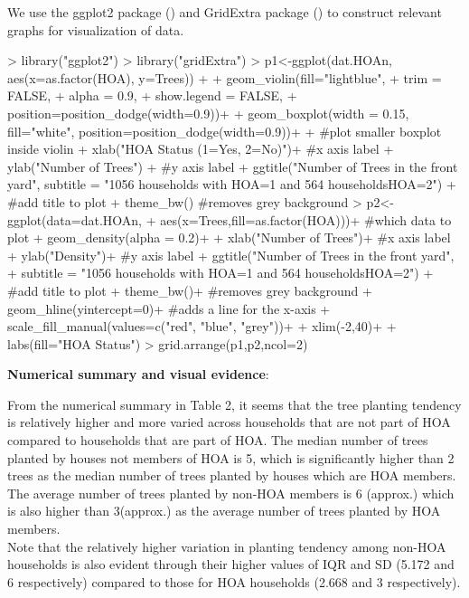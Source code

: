 \documentclass{article}
\begin{document}
We use the ggplot2 package ({\cite{ggplot2q}}) and GridExtra package ({\cite{gride}}) to construct relevant graphs for visualization of data.

\begin{Schunk}
\begin{Sinput}
> library("ggplot2") 
> library("gridExtra")
> p1<-ggplot(dat.HOAn, aes(x=as.factor(HOA), y=Trees)) + 
+   geom_violin(fill="lightblue",    
+               trim = FALSE,
+               alpha = 0.9, 
+               show.legend = FALSE,
+               position=position_dodge(width=0.9))+
+   geom_boxplot(width = 0.15, fill="white", position=position_dodge(width=0.9))+
+   #plot smaller boxplot inside violin
+   xlab("HOA Status (1=Yes, 2=No)")+ #x axis label
+   ylab("Number of Trees")    + #y axis label
+   ggtitle("Number of Trees in the front yard", subtitle = "1056 households with HOA=1 and 564 households\nwith HOA=2") + #add title to plot
+   theme_bw()  #removes grey background 
> p2<-ggplot(data=dat.HOAn, 
+            aes(x=Trees,fill=as.factor(HOA)))+ #which data to plot
+   geom_density(alpha = 0.2)+
+   xlab("Number of Trees")+ #x axis label
+   ylab("Density")+ #y axis label
+   ggtitle("Number of Trees in the front yard",
+           subtitle = "1056 households with HOA=1 and 564 households\nwith HOA=2") + #add title to plot
+   theme_bw()+ #removes grey background 
+   geom_hline(yintercept=0)+  #adds a line for the x-axis
+   scale_fill_manual(values=c("red", "blue", "grey"))+
+   xlim(-2,40)+
+   labs(fill="HOA Status")
> grid.arrange(p1,p2,ncol=2)
\end{Sinput}
\end{Schunk}

\textbf{Numerical summary and visual evidence}: 

From the numerical summary in Table 2, it seems that the tree planting tendency is relatively higher and more varied across households that are not part of HOA compared to households that are part of HOA. The median number of trees planted by houses not members of HOA is 5, which is significantly higher than 2 trees as the median number of trees planted by houses which are HOA members. The average number of trees planted by non-HOA members is 6 (approx.) which is also higher than 3(approx.) as the average number of trees planted by HOA members.\\

Note that the relatively higher variation in planting tendency among non-HOA households is also evident through their higher values of IQR and SD (5.172 and 6 respectively) compared to those for HOA households (2.668 and 3 respectively).\\
\end{document}
